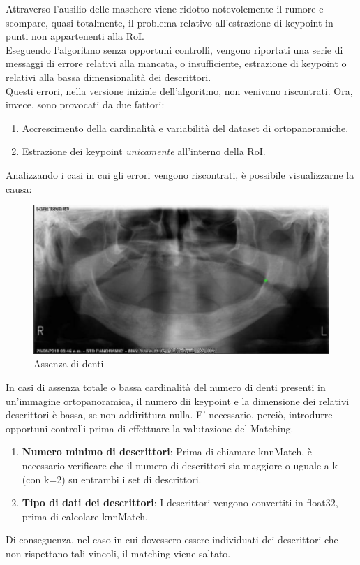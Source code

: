 \documentclass[12pt,a4paper,openright,twoside]{book}
\begin{document}
Attraverso l'ausilio delle maschere viene ridotto notevolemente il rumore e scompare, quasi totalmente, il problema relativo all'estrazione di keypoint in punti non appartenenti alla RoI.\\

Eseguendo l'algoritmo senza opportuni controlli, vengono riportati una serie di messaggi di errore relativi alla mancata, o insufficiente, estrazione di keypoint o relativi alla bassa dimensionalità dei descrittori.\\

Questi errori, nella versione iniziale dell'algoritmo, non venivano riscontrati. Ora, invece, sono provocati da due fattori:
\begin{enumerate}
\item Accrescimento della cardinalità e variabilità del dataset di ortopanoramiche.
\item Estrazione dei keypoint {\itshape unicamente} all'interno della RoI.
\end{enumerate}

Analizzando i casi in cui gli errori vengono riscontrati, è possibile visualizzarne la causa:
\begin{figure}[H]
  	\centering
	\includegraphics{figures/nodenti.pdf}
   	\caption{Assenza di denti}
	\label{fig:nodenti}
\end{figure} 

In casi di assenza totale o bassa cardinalità del numero di denti presenti in un'immagine ortopanoramica, il numero dii keypoint e la dimensione dei relativi descrittori è bassa, se non addirittura nulla. E' necessario, perciò, introdurre opportuni controlli prima di effettuare la valutazione del Matching.
\begin{enumerate}
\item \textbf{Numero minimo di descrittori}: Prima di chiamare knnMatch, è necessario verificare che il numero di descrittori sia maggiore o uguale a k (con k=2) su entrambi i set di descrittori.
\item \textbf{Tipo di dati dei descrittori}: I descrittori vengono convertiti in float32, prima di calcolare knnMatch.
\end{enumerate}
Di conseguenza, nel caso in cui dovessero essere individuati dei descrittori che non rispettano tali vincoli, il matching viene saltato.
\end{document}
